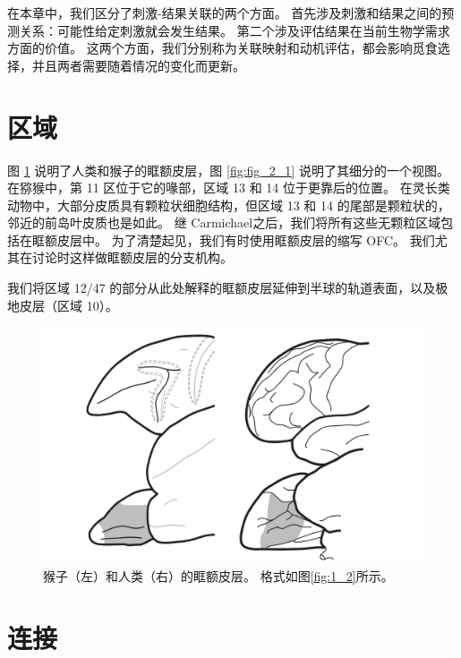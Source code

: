 在本章中，我们区分了刺激-结果关联的两个方面。
首先涉及刺激和结果之间的预测关系：可能性给定刺激就会发生结果。
第二个涉及评估结果在当前生物学需求方面的价值。
这两个方面，我们分别称为关联映射和动机评估，都会影响觅食选择，并且两者需要随着情况的变化而更新。\par



\section{区域}

图 \ref{fig:fig_4_1} 说明了人类和猴子的眶额皮层，图 \ref{fig:fig_2_1} 说明了其细分的一个视图。
在猕猴中，第 11 区位于它的喙部，区域 13 和 14 位于更靠后的位置\cite{walker1940cytoarchitectural}。
在灵长类动物中，大部分皮质具有颗粒状细胞结构，但区域 13 和 14 的尾部是颗粒状的，邻近的前岛叶皮质也是如此。
继 Carmichael\cite{carmichael1994architectonic}之后，我们将所有这些无颗粒区域包括在眶额皮层中。
为了清楚起见，我们有时使用眶额皮层的缩写 OFC。
我们尤其在讨论时这样做眶额皮层的分支机构。\par


我们将区域 12/47 的部分从此处解释的眶额皮层延伸到半球的轨道表面，以及极地皮层（区域 10）。


\begin{figure}[!htb]
	\centering
	\includegraphics{image_pfc/Fig_4_1}
	\caption{猴子（左）和人类（右）的眶额皮层。 
		格式如图\ref{fig:1_2}所示。}\label{fig:fig_4_1}
\end{figure}



\section{连接}

